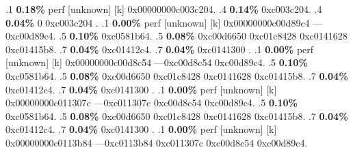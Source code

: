 \begin{profile}
{.1 \textbf{ 0.18\%} perf             [unknown]              [k] 0x00000000c003c204. 
.4 \textbf{0.14\%} 0xc003c204. 
.4 \textbf{0.04\%} 0\newline {} 0xc003c204\newline {} . 
.1 \textbf{ 0.00\%} perf             [unknown]              [k] 0x00000000c00d89c4\newline {} ---0xc00d89c4. 
.5 \textbf{0.10\%} 0xc0581b64. 
.5 \textbf{0.08\%} 0xc00d6650\newline {} 0xc01c8428\newline {} 0xc0141628\newline {} 0xc01415b8. 
.7 \textbf{0.04\%} 0xc01412c4. 
.7 \textbf{0.04\%} 0xc0141300\newline {} . 
.1 \textbf{ 0.00\%} perf             [unknown]              [k] 0x00000000c00d8c54\newline {} ---0xc00d8c54\newline {} 0xc00d89c4. 
.5 \textbf{0.10\%} 0xc0581b64. 
.5 \textbf{0.08\%} 0xc00d6650\newline {} 0xc01c8428\newline {} 0xc0141628\newline {} 0xc01415b8. 
.7 \textbf{0.04\%} 0xc01412c4. 
.7 \textbf{0.04\%} 0xc0141300\newline {} . 
.1 \textbf{ 0.00\%} perf             [unknown]              [k] 0x00000000c011307c\newline {} ---0xc011307c\newline {} 0xc00d8c54\newline {} 0xc00d89c4. 
.5 \textbf{0.10\%} 0xc0581b64. 
.5 \textbf{0.08\%} 0xc00d6650\newline {} 0xc01c8428\newline {} 0xc0141628\newline {} 0xc01415b8. 
.7 \textbf{0.04\%} 0xc01412c4. 
.7 \textbf{0.04\%} 0xc0141300\newline {} . 
.1 \textbf{ 0.00\%} perf             [unknown]              [k] 0x00000000c0113b84\newline {} ---0xc0113b84\newline {} 0xc011307c\newline {} 0xc00d8c54\newline {} 0xc00d89c4. 
}
\end{profile}

